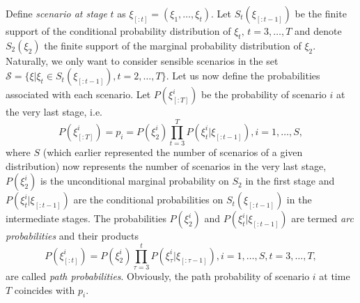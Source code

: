 Define \textit{scenario at stage} $t$ as $\xi_{[:t]} = (\xi_1,\dots,\xi_t)$.
Let $S_t(\xi_{[:t-1]})$ be the finite support of the conditional probability distribution of $\xi_t, \, t=3,\dots,T$ and denote $S_2(\xi_{2})$ the finite support of the marginal probability distribution of $\xi_2$. Naturally, we only want to consider sensible scenarios in the set $\mathcal{S}=\{\xi|\xi_t \in S_t(\xi_{[:t-1]}), t=2,\dots,T\}$. Let us now define the probabilities associated with each scenario. Let $P(\xi_{[:T]}^i)$ be the probability of scenario $i$ at the very last stage, i.e.
\begin{equation}
P(\xi_{[:T]}^i)=p_i=P(\xi_2^i)\prod_{t=3}^{T}P(\xi_t^i|\xi_{[:t-1]}), i=1,\dots,S,
\end{equation}
where $S$ (which earlier represented the number of scenarios of a given distribution) now represents the number of scenarios in the very last stage, $P(\xi_2^i)$ is the unconditional marginal probability on $S_2$ in the first stage and $P(\xi_t^i|\xi_{[:t-1]})$ are the conditional probabilities on $S_t(\xi_{[:t-1]})$ in the intermediate stages. The probabilities $P(\xi_2^i)$ and $P(\xi_t^i|\xi_{[:t-1]})$ are termed \textit{arc probabilities} and their products
\begin{equation}
P(\xi_{[:t]}^i)=P(\xi_2^i)\prod_{\tau=3}^{t}P(\xi_\tau^i|\xi_{[:\tau-1]}), i=1,\dots,S, t=3,\dots,T,
\end{equation}
are called \textit{path probabilities}. Obviously, the path probability of scenario $i$ at time $T$ coincides with $p_i$. 	 

